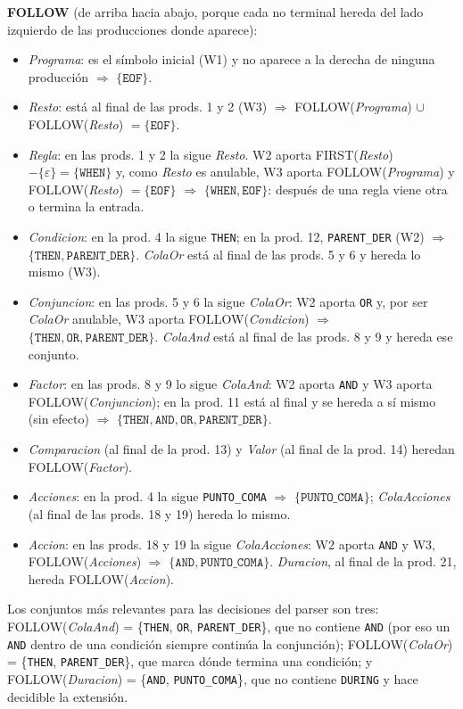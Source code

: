 \documentclass[11pt,letterpaper]{article}
\newcommand{\T}[1]{\texttt{#1}}
\newcommand{\NT}[1]{\textit{#1}}
\begin{document}
\textbf{FOLLOW} (de arriba hacia abajo, porque cada no terminal hereda del lado izquierdo de las producciones donde
aparece):
\begin{itemize}
\item \NT{Programa}: es el símbolo inicial (W1) y no aparece a la derecha de ninguna producción $\Rightarrow$ $\{\T{EOF}\}$.
\item \NT{Resto}: está al final de las prods. 1 y 2 (W3) $\Rightarrow$ FOLLOW(\NT{Programa}) $\cup$ FOLLOW(\NT{Resto}) $=\{\T{EOF}\}$.
\item \NT{Regla}: en las prods. 1 y 2 la sigue \NT{Resto}. W2 aporta FIRST(\NT{Resto}) $-\{\varepsilon\} = \{\T{WHEN}\}$ y,
como \NT{Resto} es anulable, W3 aporta FOLLOW(\NT{Programa}) y FOLLOW(\NT{Resto}) $=\{\T{EOF}\}$ $\Rightarrow$
$\{\T{WHEN}, \T{EOF}\}$: después de una regla viene otra o termina la entrada.
\item \NT{Condicion}: en la prod. 4 la sigue \T{THEN}; en la prod. 12, \T{PARENT\_DER} (W2) $\Rightarrow$
$\{\T{THEN}, \T{PARENT\_DER}\}$. \NT{ColaOr} está al final de las prods. 5 y 6 y hereda lo mismo (W3).
\item \NT{Conjuncion}: en las prods. 5 y 6 la sigue \NT{ColaOr}: W2 aporta \T{OR} y, por ser \NT{ColaOr} anulable, W3
aporta FOLLOW(\NT{Condicion}) $\Rightarrow$ $\{\T{THEN}, \T{OR}, \T{PARENT\_DER}\}$. \NT{ColaAnd} está al final de las
prods. 8 y 9 y hereda ese conjunto.
\item \NT{Factor}: en las prods. 8 y 9 lo sigue \NT{ColaAnd}: W2 aporta \T{AND} y W3 aporta FOLLOW(\NT{Conjuncion});
en la prod. 11 está al final y se hereda a sí mismo (sin efecto) $\Rightarrow$
$\{\T{THEN}, \T{AND}, \T{OR}, \T{PARENT\_DER}\}$.
\item \NT{Comparacion} (al final de la prod. 13) y \NT{Valor} (al final de la prod. 14) heredan FOLLOW(\NT{Factor}).
\item \NT{Acciones}: en la prod. 4 la sigue \T{PUNTO\_COMA} $\Rightarrow$ $\{\T{PUNTO\_COMA}\}$; \NT{ColaAcciones}
(al final de las prods. 18 y 19) hereda lo mismo.
\item \NT{Accion}: en las prods. 18 y 19 la sigue \NT{ColaAcciones}: W2 aporta \T{AND} y W3, FOLLOW(\NT{Acciones})
$\Rightarrow$ $\{\T{AND}, \T{PUNTO\_COMA}\}$. \NT{Duracion}, al final de la prod. 21, hereda FOLLOW(\NT{Accion}).
\end{itemize}

Los conjuntos más relevantes para las decisiones del parser son tres:
FOLLOW(\NT{ColaAnd}) = \{\T{THEN}, \T{OR}, \T{PARENT\_DER}\}, que no contiene \T{AND} (por eso un \T{AND} dentro de una
condición siempre continúa la conjunción); FOLLOW(\NT{ColaOr}) = \{\T{THEN}, \T{PARENT\_DER}\}, que marca dónde termina
una condición; y FOLLOW(\NT{Duracion}) = \{\T{AND}, \T{PUNTO\_COMA}\}, que no contiene \T{DURING} y hace decidible la
extensión.
\end{document}
